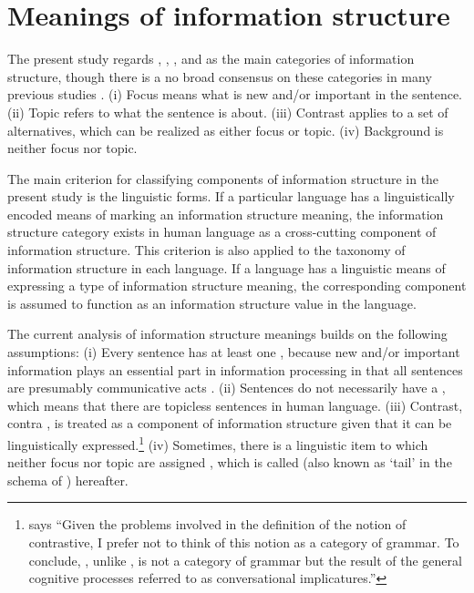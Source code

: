 \chapter{Meanings of information structure}
\label{chapter3}
\setcounter{enums}{0}


The present study regards , , , and 
as the main categories of information structure, though there is a no
broad consensus on these categories in many previous studies
\citep{lambrecht:96,gundel:99,fery:krifka:08}. (i) Focus
means what is new and/or important in the sentence. (ii) Topic refers
to what the sentence is about. (iii) Contrast applies to a set of
alternatives, which can be realized as either
focus or topic.  (iv) Background is neither focus nor topic.


The main criterion for classifying components of information structure
in the present study is the linguistic forms.  If a particular
language has a linguistically encoded means of marking an information
structure meaning, the information structure category exists in human
language as a cross-cutting component of information structure.  This
criterion is also applied to the taxonomy of information structure in
each language. If a language has a linguistic means of expressing a
type of information structure meaning, the corresponding component is
assumed to function as an information structure value in the language.


The current analysis of information structure meanings builds on the
following assumptions: (i) Every sentence has at least one , because new
and/or important information plays an essential part in information
processing in that all sentences are presumably communicative acts
\citep{engdahl:vallduvi:96,gundel:99}.  (ii) Sentences do not
necessarily have a  \citep{buring:99}, which means that there are
topicless sentences in human language.  (iii) Contrast, contra
\citet{lambrecht:96}, is treated as a component of information
structure given that it can be linguistically
expressed.\footnote{\citet[290--291]{lambrecht:96} says ``Given
  the problems involved in the definition of the notion of
  contrastive, I prefer not to think of this notion as a category of
  grammar. To conclude, , unlike , is not a
  category of grammar but the result of the general cognitive
  processes referred to as conversational implicatures.''} (iv)
Sometimes, there is a linguistic item to which neither focus nor topic
are assigned \citep{buring:99}, which is called 
(also known as `tail' in the schema of \citeauthor{vallduvi:vilkuna:98})
hereafter.


